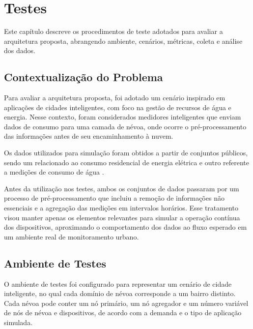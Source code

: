 \chapter{Testes}\label{cap:testes}

Este capítulo descreve os procedimentos de teste adotados para avaliar a arquitetura proposta, abrangendo ambiente, cenários, métricas, coleta e análise dos dados.

\section{Contextualização do Problema}

Para avaliar a arquitetura proposta, foi adotado um cenário inspirado em aplicações de cidades inteligentes, com foco na gestão de recursos de água e energia. Nesse contexto, foram considerados medidores inteligentes que enviam dados de consumo para uma camada de névoa, onde ocorre o pré-processamento das informações antes de seu encaminhamento à nuvem.

Os dados utilizados para simulação foram obtidos a partir de conjuntos públicos, sendo um relacionado ao consumo residencial de energia elétrica \cite{uci_energy} e outro referente a medições de consumo de água \cite{greek_water}.

Antes da utilização nos testes, ambos os conjuntos de dados passaram por um processo de pré-processamento que incluiu a remoção de informações não essenciais e a agregação das medições em intervalos horários. Esse tratamento visou manter apenas os elementos relevantes para simular a operação contínua dos dispositivos, aproximando o comportamento dos dados ao fluxo esperado em um ambiente real de monitoramento urbano.

\section{Ambiente de Testes}

O ambiente de testes foi configurado para representar um cenário de cidade inteligente, no qual cada domínio de névoa corresponde a um bairro distinto. Cada névoa pode conter um nó primário, um nó agregador e um número variável de nós de névoa e dispositivos, de acordo com a demanda e o tipo de aplicação simulada.

